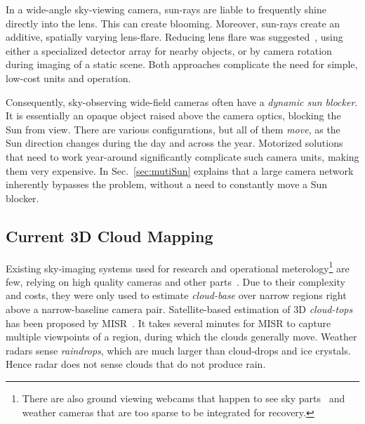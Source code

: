 \documentclass[runningheads]{llncs}
\begin{document}
In a wide-angle sky-viewing camera, sun-rays are liable to frequently shine directly into the lens. This can create blooming. Moreover, sun-rays create an additive, spatially varying lens-flare. Reducing lens flare was suggested~\cite{Koreban2009,Raskar2008,Talvala2007,Rouf2011}, using either a specialized detector array for nearby objects, or by camera rotation during imaging of a static scene. Both approaches complicate the need for simple, low-cost units and operation.

Consequently, sky-observing wide-field cameras often have a {\em dynamic sun blocker}. It is essentially an opaque object raised above the camera optics, blocking the Sun from view. There are various configurations, but all of them {\em move}, as the Sun direction changes during the day and across the year. Motorized solutions~\cite{Pust2008} that need to work year-around significantly complicate such camera units, making them very expensive. In Sec.~\ref{sec:mutiSun} explains that a large camera network inherently bypasses the problem, without a need to constantly move a Sun blocker.




\subsection{Current 3D Cloud Mapping}
\label{sec:current3D}

Existing sky-imaging systems used for research and operational meterology\footnote{There are also ground viewing webcams that happen to see sky parts~\cite{bradley,jacobs14cloudmap} and weather cameras
that are too sparse to be integrated for recovery.} are few, relying on high quality cameras and other parts~\cite{allmen,angeo-27-953-2009,cazorla,long,Seiz,kassianov}. Due to their complexity and costs, they were only used to estimate {\em cloud-base} over narrow regions right above a narrow-baseline camera pair. Satellite-based estimation of 3D {\em cloud-tops} has been proposed by MISR~\cite{Seiz2006}. It takes several minutes for MISR to capture multiple viewpoints of a region, during which the clouds generally move. Weather radars sense {\em raindrops}, which are much larger than cloud-drops and ice crystals. Hence radar does not sense clouds that do not produce rain.
\end{document}
